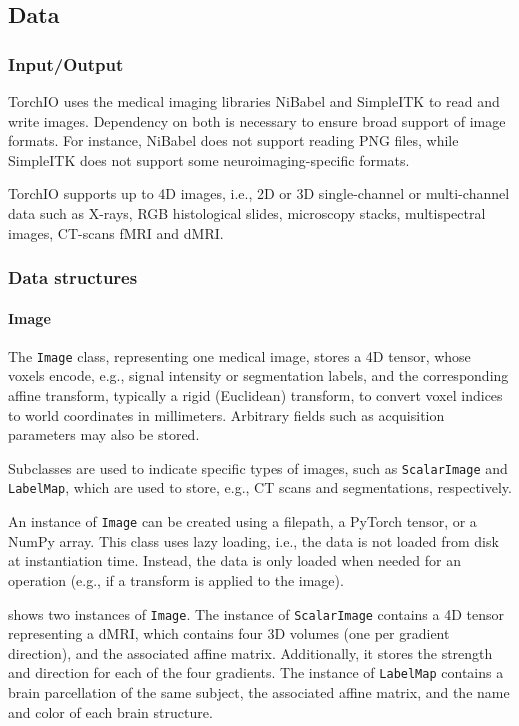 \subsection{Data}

\subsubsection{Input/Output}

TorchIO uses the medical imaging libraries NiBabel and SimpleITK to read and write images.
Dependency on both is necessary to ensure broad support of image formats.
For instance, NiBabel does not support reading \ac{PNG} files, while SimpleITK does not support some neuroimaging-specific formats.

TorchIO supports up to 4D images, i.e., 2D or 3D single-channel or multi-channel data such as X-rays, \ac{RGB} histological slides, microscopy stacks, multispectral images, \ac{CT}-scans \ac{fMRI} and \ac{dMRI}.


\subsubsection{Data structures}
\label{sec:data_structures}

\paragraph{Image}

The \texttt{Image} class, representing one medical image, stores a 4D tensor, whose voxels encode, e.g., signal intensity or segmentation labels, and the corresponding affine transform, typically a rigid (Euclidean) transform, to convert voxel indices to world coordinates in millimeters.
Arbitrary fields such as acquisition parameters may also be stored.

Subclasses are used to indicate specific types of images, such as \texttt{ScalarImage} and \texttt{LabelMap}, which are used to store, e.g., \ac{CT} scans and segmentations, respectively.

An instance of \texttt{Image} can be created using a filepath, a PyTorch tensor, or a NumPy array.
This class uses lazy loading, i.e., the data is not loaded from disk at instantiation time.
Instead, the data is only loaded when needed for an operation (e.g., if a transform is applied to the image).

 shows two instances of \texttt{Image}.
The instance of \texttt{ScalarImage} contains a 4D tensor representing a \ac{dMRI}, which contains four 3D volumes (one per gradient direction), and the associated affine matrix.
Additionally, it stores the strength and direction for each of the four gradients.
The instance of \texttt{LabelMap} contains a brain parcellation of the same subject, the associated affine matrix, and the name and color of each brain structure.

